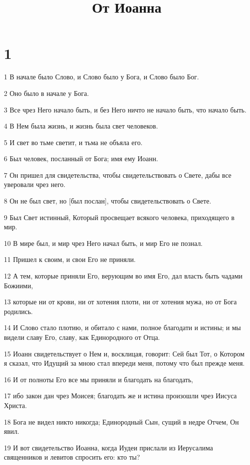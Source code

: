 

\title{От Иоанна}


\chapter{1}

\par 1 В начале было Слово, и Слово было у Бога, и Слово было Бог.
\par 2 Оно было в начале у Бога.
\par 3 Все чрез Него начало быть, и без Него ничто не начало быть, что начало быть.
\par 4 В Нем была жизнь, и жизнь была свет человеков.
\par 5 И свет во тьме светит, и тьма не объяла его.
\par 6 Был человек, посланный от Бога; имя ему Иоанн.
\par 7 Он пришел для свидетельства, чтобы свидетельствовать о Свете, дабы все уверовали чрез него.
\par 8 Он не был свет, но [был послан], чтобы свидетельствовать о Свете.
\par 9 Был Свет истинный, Который просвещает всякого человека, приходящего в мир.
\par 10 В мире был, и мир чрез Него начал быть, и мир Его не познал.
\par 11 Пришел к своим, и свои Его не приняли.
\par 12 А тем, которые приняли Его, верующим во имя Его, дал власть быть чадами Божиими,
\par 13 которые ни от крови, ни от хотения плоти, ни от хотения мужа, но от Бога родились.
\par 14 И Слово стало плотию, и обитало с нами, полное благодати и истины; и мы видели славу Его, славу, как Единородного от Отца.
\par 15 Иоанн свидетельствует о Нем и, восклицая, говорит: Сей был Тот, о Котором я сказал, что Идущий за мною стал впереди меня, потому что был прежде меня.
\par 16 И от полноты Его все мы приняли и благодать на благодать,
\par 17 ибо закон дан чрез Моисея; благодать же и истина произошли чрез Иисуса Христа.
\par 18 Бога не видел никто никогда; Единородный Сын, сущий в недре Отчем, Он явил.
\par 19 И вот свидетельство Иоанна, когда Иудеи прислали из Иерусалима священников и левитов спросить его: кто ты?
